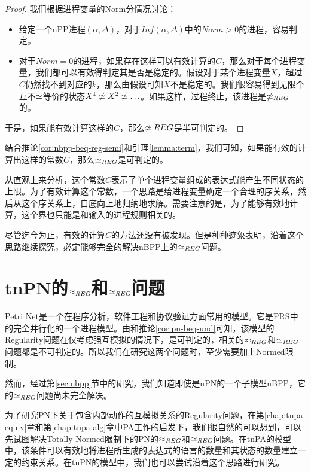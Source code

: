 \begin{proof}
我们根据进程变量的Norm分情况讨论：
\begin{itemize}
\item 给定一个nPP进程$(\alpha,\Delta)$，对于$Inf(\alpha,\Delta)$中的$Norm>0$的进程，容易判定。
\item 对于$Norm=0$的进程，如果存在这样可以有效计算的$C$，那么对于每个进程变量，我们都可以有效得判定其是否是稳定的。假设对于某个进程变量$X$，超过$C$仍然找不到对应的$k$，那么由假设可知$X$不是稳定的。我们很容易得到无限个互不$\simeq$等价的状态$X^1\not\simeq X^2\not\simeq\ldots$。如果这样，过程终止，该进程是$\not\simeq_{REG}$的。
\end{itemize}
于是，如果能有效计算这样的$C$，那么$\not\simeq{REG}$是半可判定的。
\end{proof}

结合推论\ref{cor:nbpp-beq-reg-semi}和引理\ref{lemma:term}，我们可知，如果能有效的计算出这样的常数$C$，那么$\simeq_{REG}$是可判定的。

从直观上来分析，这个常数$C$表示了单个进程变量组成的表达式能产生不同状态的上限。为了有效计算这个常数，一个思路是给进程变量确定一个合理的序关系，然后从这个序关系上，自底向上地归纳地求解。需要注意的是，为了能够有效地计算，这个界也只能是和输入的进程规则相关的。

尽管迄今为止，有效的计算$C$的方法还没有被发现。但是种种迹象表明，沿着这个思路继续探究，必定能够完全的解决nBPP上的$\simeq_{REG}$问题。

\section{tnPN的$\approx_{REG}$和$\simeq_{REG}$问题}
\label{sec:tnPN}

Petri Net是一个在程序分析，软件工程和协议验证方面常用的模型。它是PRS中的完全并行化的一个进程模型。由\cite{Jancar1996}和推论\ref{cor:pn-beq-und}可知，该模型的Regularity问题在仅考虑强互模拟的情况下，是可判定的，相关的$\approx_{REG}$和$\simeq_{REG}$问题都是不可判定的。所以我们在研究这两个问题时，至少需要加上Normed限制。

然而，经过第\ref{sec:nbpp}节中的研究，我们知道即使是nPN的一个子模型nBPP，它的$\simeq_{REG}$问题尚未完全解决。

为了研究PN下关于包含内部动作的互模拟关系的Regularity问题，在第\ref{chap:tnpa-equiv}章和第\ref{chap:tnpa-alg}章中PA工作的启发下，我们很自然的可以想到，可以先试图解决Totally Normed限制下的PN的$\approx_{REG}$和$\simeq_{REG}$问题。在tnPA的模型中，该条件可以有效地将进程所生成的表达式的语言的数量和其状态的数量建立一定的约束关系。在tnPN的模型中，我们也可以尝试沿着这个思路进行研究。

